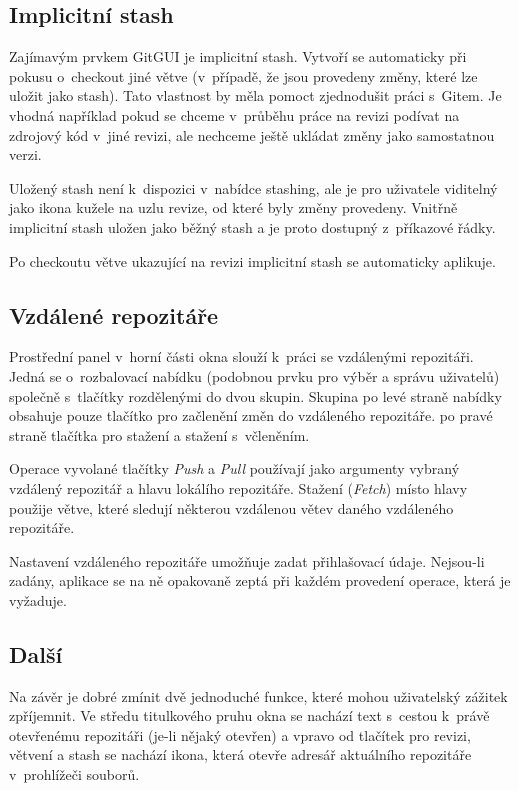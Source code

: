 \documentclass[
  biblatex,
  glossaries,
  index
]{kidiplom}
\begin{document}
\subsection{Implicitní stash}
Zajímavým prvkem GitGUI je implicitní stash. Vytvoří se automaticky při pokusu o~checkout jiné větve (v~případě, že jsou provedeny změny, které lze uložit jako stash). Tato vlastnost by měla pomoct zjednodušit práci s~Gitem. Je vhodná například pokud se chceme v~průběhu práce na revizi podívat na zdrojový kód v~jiné revizi, ale nechceme ještě ukládat změny jako samostatnou verzi.

Uložený stash není k~dispozici v~nabídce stashing, ale je pro uživatele viditelný jako ikona kužele na uzlu revize, od které byly změny provedeny. Vnitřně implicitní stash uložen jako běžný stash a je proto dostupný z~příkazové řádky.

Po checkoutu větve ukazující na revizi  implicitní stash se automaticky aplikuje.

\subsection{Vzdálené repozitáře}
Prostřední panel v~horní části okna slouží k~práci se vzdálenými repozitáři. Jedná se o~rozbalovací nabídku (podobnou prvku pro výběr a správu uživatelů) společně s~tlačítky rozdělenými do dvou skupin. Skupina po levé straně nabídky obsahuje pouze tlačítko pro začlenění změn do vzdáleného repozitáře. po pravé straně tlačítka pro stažení a stažení s~včleněním.

Operace vyvolané tlačítky {\it Push} a {\it Pull} používají jako argumenty vybraný vzdálený repozitář a hlavu lokálího repozitáře. Stažení ({\it Fetch}) místo hlavy použije větve, které sledují některou vzdálenou větev daného vzdáleného repozitáře.

Nastavení vzdáleného repozitáře umožňuje zadat přihlašovací údaje. Nejsou-li zadány, aplikace se na ně opakovaně zeptá při každém provedení operace, která je vyžaduje.

\subsection{Další}
Na závěr je dobré zmínit dvě jednoduché funkce, které mohou uživatelský zážitek zpříjemnit.
Ve středu titulkového pruhu okna se nachází text s~cestou k~právě otevřenému repozitáři (je-li nějaký otevřen) a vpravo od tlačítek pro revizi, větvení a stash se nachází ikona, která otevře adresář aktuálního repozitáře v~prohlížeči souborů.
\end{document}
